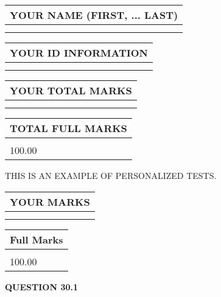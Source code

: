 \documentclass[12pt]{article}
\begin{document}
   
\newpage 
\setcounter{page}{ 
    30001 } 
   
   
   
   
\noindent\begin{tabular}{|l|}
\hline
YOUR NAME (FIRST, ... LAST)  \\
\hline
 \\ 
 \\ 
\hline
\end{tabular}
\hspace{0.05in} \begin{tabular}{|l|}
\hline
 YOUR   ID   INFORMATION  \\
\hline
 \\ 
 \\ 
\hline
\end{tabular}
   
   
\vspace{0.2in}\noindent\begin{tabular}{|l|}
\hline
YOUR TOTAL MARKS  \\
\hline
 \\ 
 \\ 
\hline
\end{tabular}
\hspace{0.05in} \begin{tabular}{|l|}
\hline
TOTAL FULL MARKS  \\
\hline
 \\ 
100.00 \\
\hline
\end{tabular}
   
   
 \vspace{0.2in}
{\Huge  THIS IS AN EXAMPLE OF}
{\Huge  PERSONALIZED TESTS. }
   
   
  
\vspace{0.2in}
  
\noindent\begin{tabular}{|l|}
\hline
 YOUR MARKS  \\
\hline
 \\ 
 \\ 
\hline
\end{tabular}
\hspace{0.05in} \begin{tabular}{|l|}
\hline
 Full Marks  \\
\hline
 \\ 
100.00 \\
\hline
\end{tabular}
{\textbf{\Large{QUESTION
30.1 
}}}
  
\end{document}
